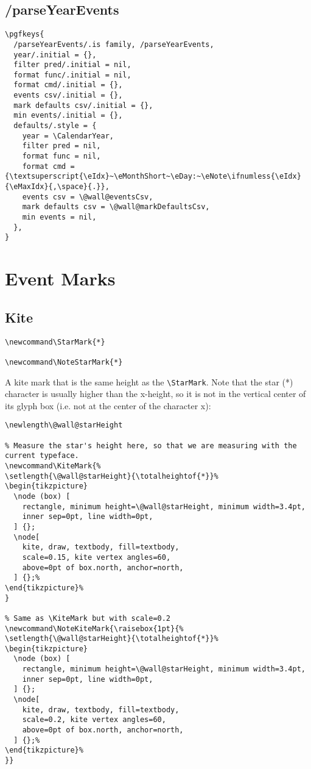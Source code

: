 \documentclass[11pt,oneside]{memoir-article}
\begin{document}
\section{/parseYearEvents}
\label{sec:org966a94d}

\begin{verbatim}
\pgfkeys{
  /parseYearEvents/.is family, /parseYearEvents,
  year/.initial = {},
  filter pred/.initial = nil,
  format func/.initial = nil,
  format cmd/.initial = {},
  events csv/.initial = {},
  mark defaults csv/.initial = {},
  min events/.initial = {},
  defaults/.style = {
    year = \CalendarYear,
    filter pred = nil,
    format func = nil,
    format cmd = {\textsuperscript{\eIdx}~\eMonthShort~\eDay:~\eNote\ifnumless{\eIdx}{\eMaxIdx}{,\space}{.}},
    events csv = \@wall@eventsCsv,
    mark defaults csv = \@wall@markDefaultsCsv,
    min events = nil,
  },
}
\end{verbatim}

\chapter{Event Marks}
\label{sec:org8a583ff}
\section{Kite}
\label{sec:org126ee45}

\begin{verbatim}
\newcommand\StarMark{*}

\newcommand\NoteStarMark{*}
\end{verbatim}

A kite mark that is the same height as the \texttt{\textbackslash{}StarMark}. Note that the star (*)
character is usually higher than the x-height, so it is not in the vertical
center of its glyph box (i.e. not at the center of the character x):

 \frame{*}

\begin{verbatim}
\newlength\@wall@starHeight

% Measure the star's height here, so that we are measuring with the current typeface.
\newcommand\KiteMark{%
\setlength{\@wall@starHeight}{\totalheightof{*}}%
\begin{tikzpicture}
  \node (box) [
    rectangle, minimum height=\@wall@starHeight, minimum width=3.4pt,
    inner sep=0pt, line width=0pt,
  ] {};
  \node[
    kite, draw, textbody, fill=textbody,
    scale=0.15, kite vertex angles=60,
    above=0pt of box.north, anchor=north,
  ] {};%
\end{tikzpicture}%
}

% Same as \KiteMark but with scale=0.2
\newcommand\NoteKiteMark{\raisebox{1pt}{%
\setlength{\@wall@starHeight}{\totalheightof{*}}%
\begin{tikzpicture}
  \node (box) [
    rectangle, minimum height=\@wall@starHeight, minimum width=3.4pt,
    inner sep=0pt, line width=0pt,
  ] {};
  \node[
    kite, draw, textbody, fill=textbody,
    scale=0.2, kite vertex angles=60,
    above=0pt of box.north, anchor=north,
  ] {};%
\end{tikzpicture}%
}}
\end{verbatim}
\end{document}
